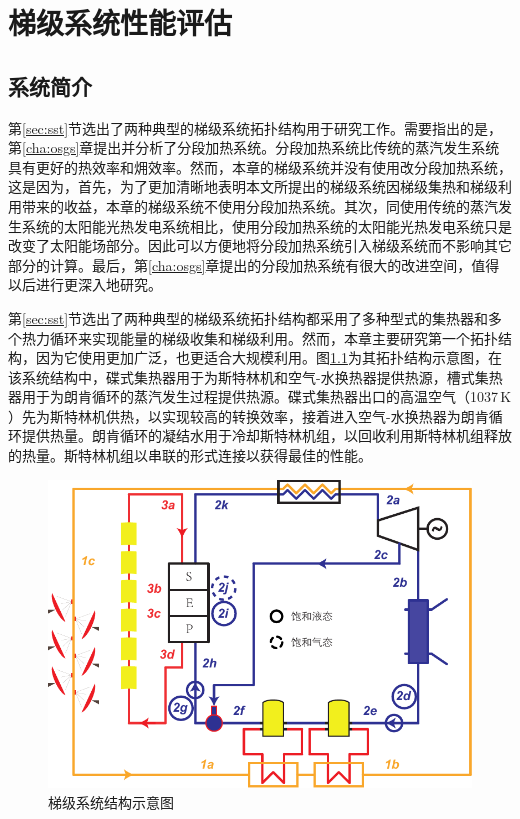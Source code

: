\chapter{梯级系统性能评估}
\section{系统简介}

第\ref{sec:sst}节选出了两种典型的梯级系统拓扑结构用于研究工作。需要指出的是，第\ref{cha:osgs}章提出并分析了分段加热系统。分段加热系统比传统的蒸汽发生系统具有更好的热效率和㶲效率。然而，本章的梯级系统并没有使用改分段加热系统，这是因为，首先，为了更加清晰地表明本文所提出的梯级系统因梯级集热和梯级利用带来的收益，本章的梯级系统不使用分段加热系统。其次，同使用传统的蒸汽发生系统的太阳能光热发电系统相比，使用分段加热系统的太阳能光热发电系统只是改变了太阳能场部分。因此可以方便地将分段加热系统引入梯级系统而不影响其它部分的计算。最后，第\ref{cha:osgs}章提出的分段加热系统有很大的改进空间，值得以后进行更深入地研究。

第\ref{sec:sst}节选出了两种典型的梯级系统拓扑结构都采用了多种型式的集热器和多个热力循环来实现能量的梯级收集和梯级利用。然而，本章主要研究第一个拓扑结构，因为它使用更加广泛，也更适合大规模利用。图\ref{fig:System-1}为其拓扑结构示意图，在该系统结构中，碟式集热器用于为斯特林机和空气-水换热器提供热源，槽式集热器用于为朗肯循环的蒸汽发生过程提供热源。碟式集热器出口的高温空气（1037$\,\mathrm{K}$）先为斯特林机供热，以实现较高的转换效率，接着进入空气-水换热器为朗肯循环提供热量。朗肯循环的凝结水用于冷却斯特林机组，以回收利用斯特林机组释放的热量。斯特林机组以串联的形式连接以获得最佳的性能。

\noindent \begin{figure}[htbp]
\begin{center}
	\includegraphics[width = 0.8\columnwidth]{fig/cascadeSystem}
	\caption{梯级系统结构示意图}
	\label{fig:System-1}
\end{center}
\end{figure}

